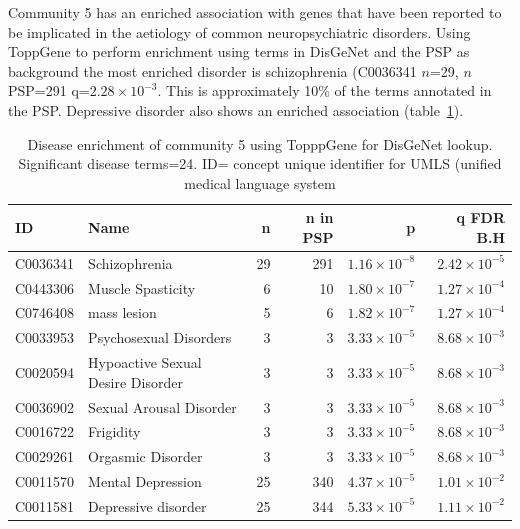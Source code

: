Community 5 has an enriched association with genes that have been reported to be implicated in the aetiology of common neuropsychiatric disorders. Using ToppGene to perform enrichment using terms in DisGeNet and the PSP as background the most enriched disorder is schizophrenia (C0036341 $n$=29, $n$ PSP=291 q=$2.28 \times 10^{-3}$. This is approximately 10\% of the terms annotated in the PSP. Depressive disorder also shows an enriched association (table~\ref{tab:Group 5 Disease 24 significant terms}).  




\begin{table}[ht]
\centering
\begin{tabular}{llrrrr}
  \toprule
ID & Name & n & n in PSP & p & q FDR B.H \\ 
  \midrule
C0036341 & Schizophrenia & 29 & 291 & $1.16 \times 10^{-8}$ & $2.42 \times 10^{-5}$ \\ 
  C0443306 & Muscle Spasticity & 6 & 10 & $1.80 \times 10^{-7}$ & $1.27 \times 10^{-4}$ \\ 
  C0746408 & mass lesion & 5 & 6 & $1.82 \times 10^{-7}$ & $1.27 \times 10^{-4}$ \\ 
  C0033953 & Psychosexual Disorders & 3 & 3 & $3.33 \times 10^{-5}$ & $8.68 \times 10^{-3}$ \\ 
  C0020594 & Hypoactive Sexual Desire Disorder & 3 & 3 & $3.33 \times 10^{-5}$ & $8.68 \times 10^{-3}$ \\ 
  C0036902 & Sexual Arousal Disorder & 3 & 3 & $3.33 \times 10^{-5}$ & $8.68 \times 10^{-3}$ \\ 
  C0016722 & Frigidity & 3 & 3 & $3.33 \times 10^{-5}$ & $8.68 \times 10^{-3}$ \\ 
  C0029261 & Orgasmic Disorder & 3 & 3 & $3.33 \times 10^{-5}$ & $8.68 \times 10^{-3}$ \\ 
  C0011570 & Mental Depression & 25 & 340 & $4.37 \times 10^{-5}$ & $1.01 \times 10^{-2}$ \\ 
  C0011581 & Depressive disorder & 25 & 344 & $5.33 \times 10^{-5}$ & $1.11 \times 10^{-2}$ \\ 
   \bottomrule
\end{tabular}
\caption{Disease enrichment of community 5 using TopppGene for DisGeNet lookup. Significant disease terms=24. ID= concept unique identifier for UMLS (unified medical language system} 
\label{tab:Group 5 Disease 24 significant terms}
\end{table}



